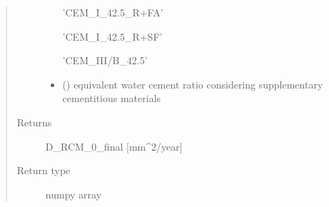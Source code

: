\documentclass[letterpaper,10pt,english]{sphinxmanual}
\begin{document}
\begin{fulllineitems}
\begin{quote}
\begin{description}
\begin{itemize}
\sphinxAtStartPar
’CEM\_I\_42.5\_R+FA’

\sphinxAtStartPar
’CEM\_I\_42.5\_R+SF’

\sphinxAtStartPar
’CEM\_III/B\_42.5’


\item {} 
\sphinxAtStartPar
{} () \textendash{} equivalent water cement ratio considering supplementary cementitious materials

\end{itemize}

\item[{Returns}] \leavevmode
\sphinxAtStartPar
D\_RCM\_0\_final {[}mm\textasciicircum{}2/year{]}

\item[{Return type}] \leavevmode
\sphinxAtStartPar
numpy array

\end{description}\end{quote}

\end{fulllineitems}

\end{document}
